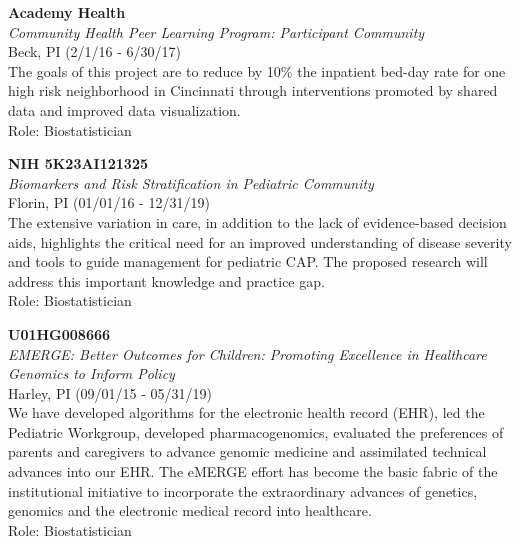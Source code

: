 \documentclass{nihbiosketch}
\begin{document}
\bigskip

\textbf{Academy Health}\\
\emph{Community Health Peer Learning Program: Participant Community}\\
Beck, PI (2/1/16 - 6/30/17)\\
The goals of this project are to reduce by 10\% the inpatient bed-day
rate for one high risk neighborhood in Cincinnati through interventions
promoted by shared data and improved data visualization.\\
Role: Biostatistician

\bigskip

\textbf{NIH 5K23AI121325}\\
\emph{Biomarkers and Risk Stratification in Pediatric Community}\\
Florin, PI (01/01/16 - 12/31/19)\\
The extensive variation in care, in addition to the lack of
evidence-based decision aids, highlights the critical need for an
improved understanding of disease severity and tools to guide management
for pediatric CAP. The proposed research will address this important
knowledge and practice gap.\\
Role: Biostatistician

%

\bigskip

\textbf{U01HG008666}\\
\emph{EMERGE: Better Outcomes for Children: Promoting Excellence in
	Healthcare Genomics to Inform Policy}\\
Harley, PI (09/01/15 - 05/31/19)\\
We have developed algorithms for the electronic health record (EHR), led
the Pediatric Workgroup, developed pharmacogenomics, evaluated the
preferences of parents and caregivers to advance genomic medicine and
assimilated technical advances into our EHR. The eMERGE effort has
become the basic fabric of the institutional initiative to incorporate
the extraordinary advances of genetics, genomics and the electronic
medical record into healthcare.\\
Role: Biostatistician
\end{document}
